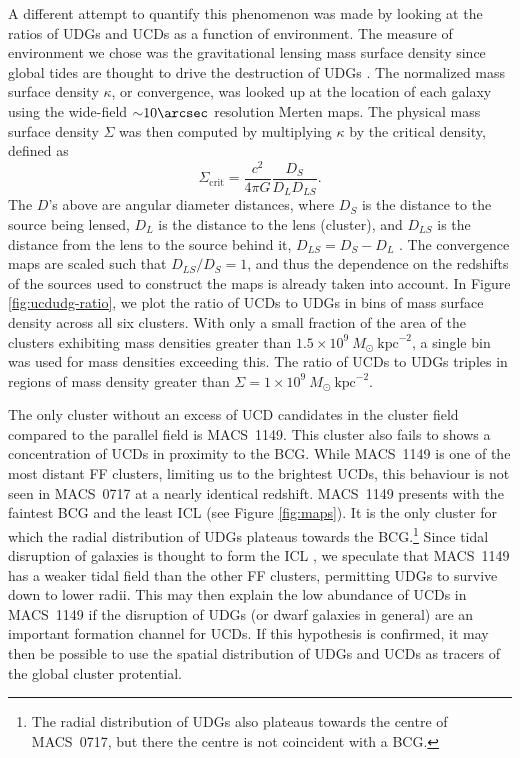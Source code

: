 \documentclass[iop,tighten,twocolumn,apj,floatfix]{emulateapj}
\begin{document}
A different attempt to quantify this phenomenon was made by looking at the
ratios of UDGs and UCDs as a function of environment.
The measure of environment we chose was the gravitational lensing mass surface
density since global tides are thought to drive the destruction of UDGs
\citep{sales2019}.
The normalized mass surface density $\kappa$, or convergence, was looked up at
the location of each galaxy using the wide-field ${{\sim}10\arcsec}$
resolution Merten maps.
The physical mass surface density $\Sigma$ was then computed by multiplying $\kappa$ by
the critical density, defined as
\begin{equation}
    \Sigma_\mathrm{crit} = \frac{c^2}{4 \pi G} \frac{D_{S}}{D_{L} D_{LS}}.
\end{equation}
The $D$'s above are angular diameter distances, where $D_S$ is the distance
to the source being lensed, $D_L$ is the distance
to the lens (cluster), and $D_{LS}$ is the distance from the lens to
the source behind it, $D_{LS} = D_S - D_L$ \citep{kneib2011}. The 
convergence maps are scaled such that $D_{LS}/D_{S} = 1$, and thus the
dependence on the redshifts of the sources used to construct the maps is
already taken into account.
In Figure \ref{fig:ucdudg-ratio}, we plot the ratio of UCDs to UDGs in bins of
mass surface density across all six clusters.
With only a small fraction of the area of the clusters exhibiting mass densities greater than 
$1.5 \times 10^9~M_\odot~\mathrm{kpc}^{-2}$, a single bin was used for mass
densities exceeding this.
The ratio of UCDs to UDGs triples in regions of mass density
greater than $\Sigma = 1\times10^9~M_\odot~\mathrm{kpc}^{-2}$.

The only cluster without an excess of UCD candidates in the cluster field
compared to the parallel field is MACS~1149.
This cluster also fails to shows a concentration of UCDs in proximity to the
BCG.
While MACS~1149 is one of the most distant FF clusters, limiting us to the
brightest UCDs, this behaviour is not seen in MACS~0717 at a nearly identical
redshift.
MACS~1149 presents with the faintest BCG and the least ICL (see Figure \ref{fig:maps}).
It is the only cluster for which the radial distribution of UDGs plateaus
towards the BCG.\footnote{The radial distribution of UDGs also plateaus
towards the centre of MACS~0717, but there the centre is not coincident with a
BCG.}
Since tidal disruption of galaxies is thought to form the ICL
\citep[e.g.][]{burke2012},
we speculate that MACS~1149 has a weaker tidal field than the other FF
clusters, permitting UDGs to survive down to lower radii.
This may then explain the low abundance of UCDs in MACS~1149 if the disruption of
UDGs (or dwarf galaxies in general) are an important formation channel for
UCDs.
If this hypothesis is confirmed, it may then be possible to use the spatial
distribution of UDGs and UCDs as tracers of the global cluster protential.
\end{document}
